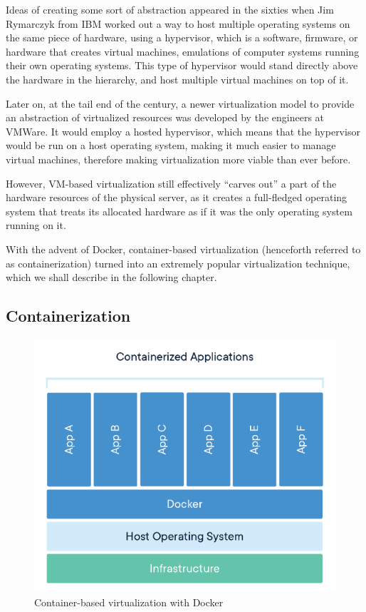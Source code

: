 \documentclass[thesis=B,english]{FITthesis}[2019/12/23]
\begin{document}
Ideas of creating some sort of abstraction appeared in the sixties when Jim Rymarczyk from IBM worked out a way to host multiple operating systems on the same piece of hardware, using a hypervisor, which is a software, firmware, or hardware that creates virtual machines, emulations of computer systems running their own operating systems. This type of hypervisor would stand directly above the hardware in the hierarchy, and host multiple virtual machines on top of it. \cite{virtualization}

Later on, at the tail end of the century, a newer virtualization model to provide an abstraction of virtualized resources was developed by the engineers at VMWare. \cite{vmware} It would employ a hosted hypervisor, which means that the hypervisor would be run on a host operating system, making it much easier to manage virtual machines, therefore making virtualization more viable than ever before. \cite{virtualization}

However, VM-based virtualization still effectively “carves out” a part of the hardware resources of the physical server, as it creates a full-fledged operating system that treats its allocated hardware as if it was the only operating system running on it.

With the advent of Docker, container-based virtualization (henceforth referred to as containerization) turned into an extremely popular virtualization technique, which we shall describe in the following chapter. 

\clearpage


\subsection{Containerization}

\begin{figure}[H]
\centering
\caption{Container-based virtualization with Docker \cite{what-container}}
\hspace*{-0.65cm}
\includegraphics[scale=0.75]{containerization}
\end{figure}
\end{document}
